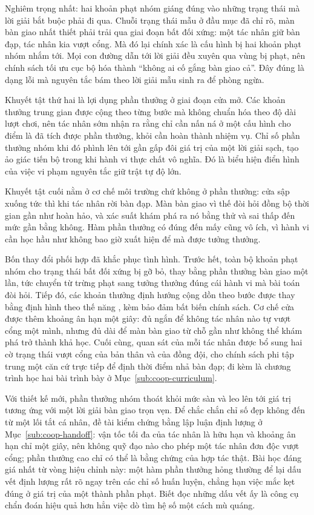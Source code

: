 \indent Nghiêm trọng nhất: hai khoản phạt nhóm giáng đúng vào những trạng thái mà lời giải
bắt buộc phải đi qua. Chuỗi trạng thái mẫu ở đầu mục đã chỉ rõ, màn bàn giao nhất thiết
phải trải qua giai đoạn bất đối xứng: một tác nhân giữ bàn đạp, tác nhân kia vượt cổng.
Mà đó lại chính xác là cấu hình bị hai khoản phạt nhóm nhắm tới. Mọi con đường dẫn tới lời
giải đều xuyên qua vùng bị phạt, nên chính sách tối ưu cục bộ hóa thành ``không ai cố gắng
bàn giao cả''. Đây đúng là dạng lỗi mà nguyên tắc bám theo lời giải mẫu sinh ra để phòng
ngừa.

\indent Khuyết tật thứ hai là lợi dụng phần thưởng ở giai đoạn cửa mở. Các khoản thưởng
trung gian được cộng theo từng bước mà không chuẩn hóa theo độ dài lượt chơi, nên tác nhân
sớm nhận ra rằng chỉ cần nấn ná ở một cấu hình cho điểm là đã tích được phần thưởng, khỏi
cần hoàn thành nhiệm vụ. Chỉ số phần thưởng nhóm khi đó phình lên tới gần gấp đôi giá trị
của một lời giải sạch, tạo ảo giác tiến bộ trong khi hành vi thực chất vô nghĩa. Đó là
biểu hiện điển hình của việc vi phạm nguyên tắc giữ trật tự độ lớn.

\indent Khuyết tật cuối nằm ở cơ chế môi trường chứ không ở phần thưởng: cửa sập xuống tức
thì khi tác nhân rời bàn đạp. Màn bàn giao vì thế đòi hỏi đồng bộ thời gian gần như hoàn
hảo, và xác suất khám phá ra nó bằng thử và sai thấp đến mức gần bằng không. Hàm phần thưởng
có đúng đến mấy cũng vô ích, vì hành vi cần học hầu như không bao giờ xuất hiện để mà được
tưởng thưởng.

\indent Bốn thay đổi phối hợp đã khắc phục tình hình. Trước hết, toàn bộ khoản phạt nhóm
cho trạng thái bất đối xứng bị gỡ bỏ, thay bằng phần thưởng bàn giao một lần, tức chuyển từ
trừng phạt sang tưởng thưởng đúng cái hành vi mà bài toán đòi hỏi. Tiếp đó, các khoản
thưởng định hướng cộng dồn theo bước được thay bằng định hình theo thế năng
\cite{ng1999policy}, kèm bảo đảm bất biến chính sách. Cơ chế cửa được thêm khoảng ân hạn
một giây: đủ ngắn để không tác nhân nào tự vượt cổng một mình, nhưng đủ dài để màn bàn
giao từ chỗ gần như không thể khám phá trở thành khả học. Cuối cùng, quan sát của mỗi tác
nhân được bổ sung hai cờ trạng thái vượt cổng của bản thân và của đồng đội, cho chính sách
phi tập trung một căn cứ trực tiếp để định thời điểm nhả bàn đạp; đi kèm là chương trình
học hai bài trình bày ở Mục~\ref{sub:coop-curriculum}.

\indent Với thiết kế mới, phần thưởng nhóm thoát khỏi mức sàn và leo lên tới giá trị tương
ứng với một lời giải bàn giao trọn vẹn. Để chắc chắn chỉ số đẹp không đến từ một lối tắt
cá nhân, đề tài kiểm chứng bằng lập luận định lượng ở Mục~\ref{sub:coop-handoff}: vận tốc
tối đa của tác nhân là hữu hạn và khoảng ân hạn chỉ một giây, nên không quỹ đạo nào cho
phép một tác nhân đơn độc vượt cổng; phần thưởng cao chỉ có thể là bằng chứng của hợp tác
thật. Bài học đáng giá nhất từ vòng hiệu chỉnh này: một hàm phần thưởng hỏng thường để lại
dấu vết định lượng rất rõ ngay trên các chỉ số huấn luyện, chẳng hạn việc mắc kẹt đúng ở
giá trị của một thành phần phạt. Biết đọc những dấu vết ấy là công cụ chẩn đoán hiệu quả
hơn hẳn việc dò tìm hệ số một cách mù quáng.

